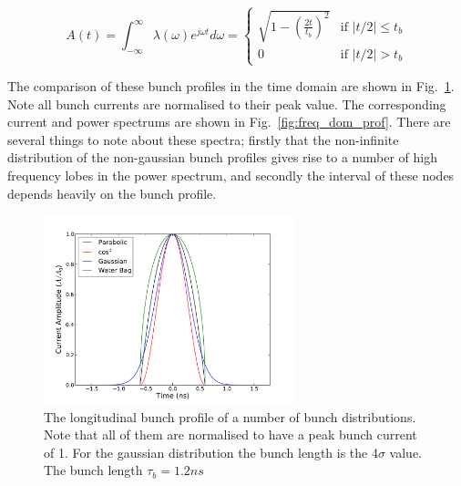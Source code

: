 \begin{equation}
A\left( t \right) = \int^{\infty}_{-\infty} \lambda \left( \omega \right) e^{j\omega t} d\omega = 
\begin{cases}
\sqrt{1-\left( \frac{2t}{t_{b}}\right)^{2}} &\textrm{if $| t/2 | \leq t_{b}$}\\
0								&\textrm{if $| t/2 | > t_{b}$}
\end{cases}
\label{eqn:water_bag_profile}
\end{equation}

The comparison of these bunch profiles in the time domain are shown in Fig.~\ref{fig:time_bunch_profiles}. Note all bunch currents are normalised to their peak value. The corresponding current and power spectrums are shown in Fig.~\ref{fig:freq_dom_prof}. There are several things to note about these spectra; firstly that the non-infinite distribution of the non-gaussian bunch profiles gives rise to a number of high frequency lobes in the power spectrum, and secondly the interval of these nodes depends heavily on the bunch profile.

\begin{figure}
\begin{center}
\includegraphics[width=0.65\textwidth]{Wakefields_and_Impedances/figures/bunch_profile_12ns.pdf}
\end{center}
\label{fig:time_bunch_profiles}
\caption{The longitudinal bunch profile of a number of bunch distributions. Note that all of them are normalised to have a peak bunch current of 1. For the gaussian distribution the bunch length is the 4$\sigma$ value. The bunch length $\tau_{b} = 1.2ns$}
\end{figure}


